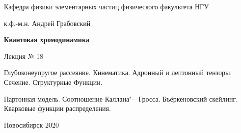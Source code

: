 \documentclass[12pt,pagesize,paper=landscape,paper=192mm:108mm]{scrbook}
\begin{document}
\begin{titlepage}
\begin{center}
    Кафедра физики элементарных частиц физического факультета НГУ
    \medskip

    \Large
    к.ф.-м.н. Андрей Грабовский
    
    \bigskip

    \huge
    \textbf{Квантовая хромодинамика}
    \bigskip

    \Large
    Лекция № 18
    \vfill

    \normalsize
    \begin{minipage}{0.65\linewidth}
      Глубоконеупругое рассеяние. Кинематика. Адронный и лептонный
      тензоры.  Сечение. Структурные Функции.

      Партонная модель. Соотношение Каллана"--~Гросса. Бъёркеновский
      скейлинг. Кварковые функции распределения.
    \end{minipage}
    \vfill

    \normalsize \ccbysa\hspace{0.5em}  Новосибирск 2020
  \end{center}
\end{titlepage}
\end{document}
